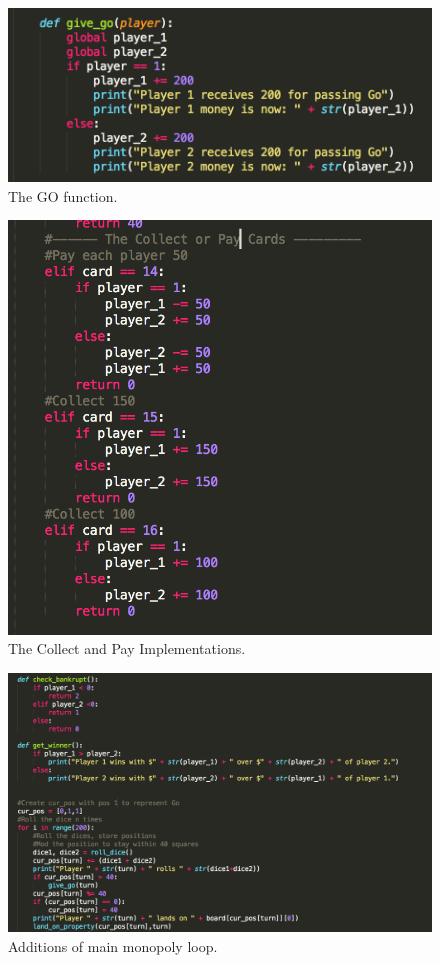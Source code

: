 \documentclass[12pt, letter]{article}
\begin{document}
 \begin{figure}[htb]
  \centering
  \includegraphics[width=0.7 \textwidth]{./figures/give_go.png}
  \caption{The GO function.}
\end{figure}

 \begin{figure}[htb]
  \centering
  \includegraphics[width=0.7 \textwidth]{./figures/extra_chance.png}
  \caption{The Collect and Pay Implementations.}
\end{figure}

 \begin{figure}[htb]
  \centering
  \includegraphics[width=0.9 \textwidth]{./figures/multi_one.png}
  \caption{Additions of main monopoly loop.}
\end{figure}
\end{document}
